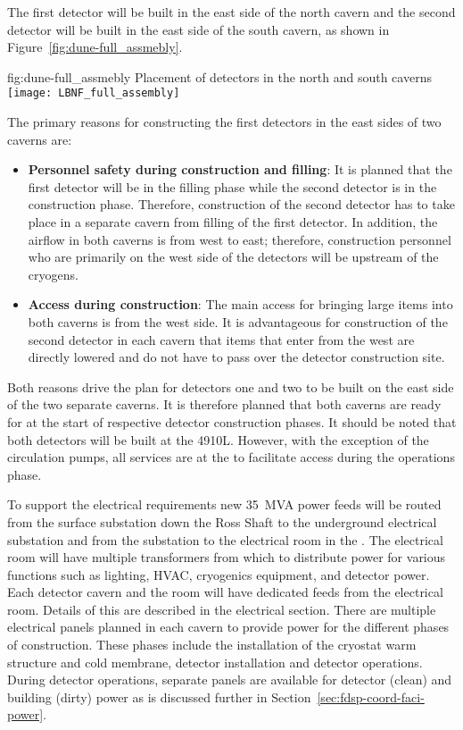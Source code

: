 The first detector will be built in the east side of the north cavern and
the second detector will be built in the east side of the south cavern, as
shown in Figure~\ref{fig:dune-full_assmebly}.
\begin{dunefigure}{fig:dune-full_assmebly}
  {Placement of detectors in the north and south caverns}
  \texttt{[image: LBNF\_full\_assembly]}
\end{dunefigure}
The primary reasons for constructing the first detectors in the east
sides of two caverns are:
\begin{itemize}
\item {\bf Personnel safety during construction and filling}: It is
  planned that the first detector will be in the filling phase while the second detector
  is in the construction phase. Therefore, construction of the 
  second detector has to take place in a separate cavern from
  filling of the first detector. In addition, the airflow in both
  caverns is from west to east; therefore, construction
  personnel who are primarily on the west side of the detectors will
  be upstream of the cryogens.
\item{\bf Access during construction}: The main access for bringing
  large items into both caverns is from the west side. It is
  advantageous for construction of the second detector in each cavern
  that items that enter from the west are directly lowered and do not
  have to pass over the detector construction site.
\end{itemize}
Both reasons drive the plan for detectors one and two to be built on
the east side of the two separate caverns.  It is therefore planned
that both caverns are ready for  at the start of respective
detector construction phases.  It should be noted that both detectors
will be built at the 4910L. However, with the exception of the
 circulation pumps, all services are at the  to
facilitate access during the operations phase.

To support the electrical requirements new 35~MVA power feeds will be
routed from the surface substation down the Ross Shaft to the
underground electrical substation and from the substation to the
electrical room in the .  The electrical room will have
multiple transformers from which to distribute power for various
functions such as lighting, HVAC, cryogenics equipment, and detector  
power.  Each detector cavern and the  room will have
dedicated feeds from the electrical room.  Details of this are
described in the electrical section.  There are multiple electrical
panels planned in each cavern to provide power for the different
phases of construction.  These phases include the installation
of the cryostat warm structure and cold membrane, detector
installation and detector operations. During detector operations, 
separate panels are available for detector (clean) and building
(dirty) power as is discussed further in
Section~\ref{sec:fdsp-coord-faci-power}.

